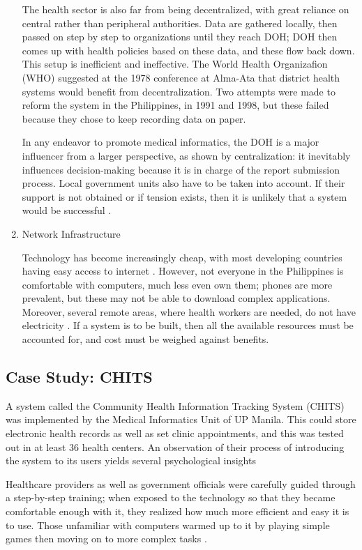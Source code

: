 \begin{enumerate}
    The health sector is also far from being decentralized, with great reliance on central rather than peripheral authorities. Data are gathered locally, then passed on step by step to organizations until they reach DOH; DOH then comes up with health policies based on these data, and these flow back down. This setup is inefficient and ineffective. The World Health Organizafion (WHO) suggested at the 1978 conference at Alma-Ata that district health systems would benefit from decentralization. Two attempts were made to reform the system in the Philippines, in 1991 and 1998, but these failed because they chose to keep recording data on paper.

    In any endeavor to promote medical informatics, the DOH is a major influencer from a larger perspective, as shown by centralization: it inevitably influences decision-making because it is in charge of the report submission process. Local government units also have to be taken into account. If their support is not obtained or if tension exists, then it is unlikely that a system would be successful \cite{premji2012implementing}.
    \item Network Infrastructure

    Technology has become increasingly cheap, with most developing countries having easy access to internet \cite{fraser2005implementing}. However, not everyone in the Philippines is comfortable with computers, much less even own them; phones are more prevalent, but these may not be able to download complex applications. Moreover, several remote areas, where health workers are needed, do not have electricity \cite{marcelo2007health}. If a system is to be built, then all the available resources must be accounted for, and cost must be weighed against benefits.
\end{enumerate}

\subsection{Case Study: CHITS}

A system called the Community Health Information Tracking System (CHITS) was implemented by the Medical Informatics Unit of UP Manila. This could store electronic health records as well as set clinic appointments, and this was tested out in at least 36 health centers. An observation of their process of introducing the system to its users yields several psychological insights \cite{premji2012implementing}

Healthcare providers as well as government officials were carefully guided through a step-by-step training; when exposed to the technology so that they became comfortable enough with it, they realized how much more efficient and easy it is to use. Those unfamiliar with computers warmed up to it by playing simple games then moving on to more complex tasks \cite{premji2012implementing}.


